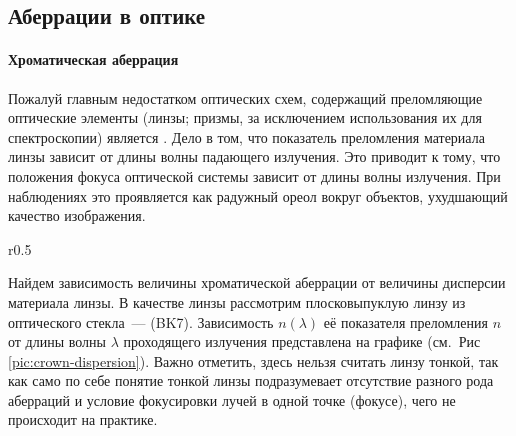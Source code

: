 \subsection{Аберрации в оптике}
\paragraph{Хроматическая аберрация}
Пожалуй главным недостатком оптических схем, содержащий преломляющие оптические элементы (линзы; призмы, за исключением использования их для спектроскопии) является . Дело в том, что показатель преломления материала линзы зависит от длины волны падающего излучения. Это приводит к тому, что положения фокуса оптической системы зависит от длины волны излучения. При наблюдениях это проявляется как радужный ореол вокруг объектов, ухудшающий качество изображения.

\begin{wrapfigure}{r}{0.5\tw}
    \centering
    \vspace{-1pc}
    \caption{}
    \label{pic:crown-dispersion}
\end{wrapfigure}
Найдем зависимость величины хроматической аберрации от величины дисперсии материала линзы. В качестве линзы рассмотрим плосковыпуклую линзу из оптического стекла~---  (BK7). Зависимость $n(\lambda)$ её показателя преломления $n$ от длины волны $\lambda$ проходящего излучения представлена на графике (см.~Рис\,\ref{pic:crown-dispersion}). Важно отметить, здесь нельзя считать линзу тонкой, так как само по себе понятие тонкой линзы подразумевает отсутствие разного рода аберраций и условие фокусировки лучей в одной точке (фокусе), чего не происходит на практике.

